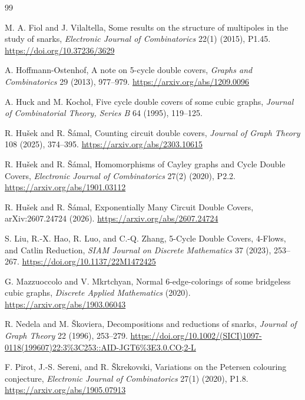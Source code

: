 \documentclass[11pt]{article}
\theoremstyle{definition}
\begin{document}
\small
\begin{thebibliography}{99}

M. A. Fiol and J. Vilaltella,
Some results on the structure of multipoles in the study of snarks,
\emph{Electronic Journal of Combinatorics} 22(1) (2015), P1.45.
\url{https://doi.org/10.37236/3629}

A. Hoffmann-Ostenhof,
A note on 5-cycle double covers,
\emph{Graphs and Combinatorics} 29 (2013), 977--979.
\url{https://arxiv.org/abs/1209.0096}

A. Huck and M. Kochol,
Five cycle double covers of some cubic graphs,
\emph{Journal of Combinatorial Theory, Series B} 64 (1995), 119--125.

R. Hu\v{s}ek and R. \v{S}\'amal,
Counting circuit double covers,
\emph{Journal of Graph Theory} 108 (2025), 374--395.
\url{https://arxiv.org/abs/2303.10615}

R. Hu\v{s}ek and R. \v{S}\'amal,
Homomorphisms of Cayley graphs and Cycle Double Covers,
\emph{Electronic Journal of Combinatorics} 27(2) (2020), P2.2.
\url{https://arxiv.org/abs/1901.03112}

R. Hu\v{s}ek and R. \v{S}\'amal,
Exponentially Many Circuit Double Covers,
arXiv:2607.24724 (2026).
\url{https://arxiv.org/abs/2607.24724}

S. Liu, R.-X. Hao, R. Luo, and C.-Q. Zhang,
5-Cycle Double Covers, 4-Flows, and Catlin Reduction,
\emph{SIAM Journal on Discrete Mathematics} 37 (2023), 253--267.
\url{https://doi.org/10.1137/22M1472425}

G. Mazzuoccolo and V. Mkrtchyan,
Normal 6-edge-colorings of some bridgeless cubic graphs,
\emph{Discrete Applied Mathematics} (2020).
\url{https://arxiv.org/abs/1903.06043}

R. Nedela and M. \v{S}koviera,
Decompositions and reductions of snarks,
\emph{Journal of Graph Theory} 22 (1996), 253--279.
\url{https://doi.org/10.1002/(SICI)1097-0118(199607)22:3%3C253::AID-JGT6%3E3.0.CO;2-L}

F. Pirot, J.-S. Sereni, and R. \v{S}krekovski,
Variations on the Petersen colouring conjecture,
\emph{Electronic Journal of Combinatorics} 27(1) (2020), P1.8.
\url{https://arxiv.org/abs/1905.07913}

\end{thebibliography}
\end{document}
